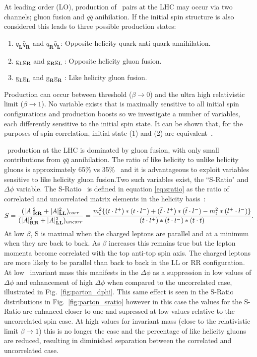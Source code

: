 At leading order (LO), production of \ttbar\ pairs at the LHC may occur via two channels; gluon fusion and $q\bar{q}$ anihilation. If the initial spin structure is also considered this leads to three possible production states:
\begin{enumerate}
\item $q_\mathbf{L}\bar{q}_\mathbf{R}$ and $q_\mathbf{R}\bar{q}_\mathbf{L}$: Opposite helicity quark anti-quark annihilation.
\item g$_\mathbf{L}$g$_\mathbf{R}$ and g$_\mathbf{R}$g$_\mathbf{L}$ : Opposite helicity gluon fusion.
\item g$_\mathbf{L}$g$_\mathbf{L}$ and g$_\mathbf{R}$g$_\mathbf{R}$ : Like helicity gluon fusion.
\end{enumerate}
Production can occur between threshold ($\beta \rightarrow 0$) and the ultra high relativistic limit ($\beta \rightarrow 1$). No variable exists that is maximally sensitive to all initial spin configurations and production boosts so we investigate a number of variables, each differently sensitive to the initial spin state. It can be shown that, for the purposes of spin correlation, initial state (1) and (2) are equivalent~\cite{mahlon:2010}. 

\ttbar\ production at the LHC is dominated by gluon fusion, with only small contributions from $q\bar{q}$ annihilation. The ratio of like helicity to unlike helicity gluons is approximately 65\% vs 35\%~\cite{mahlon:2010} and it is advantageous to exploit variables sensitive to like helicity gluon fusion.Two such variables exist, the ``S-Ratio" and $\Delta\phi$ variable. The S-Ratio~\cite{mahlon:2010} is defined in equation \ref{eq:sratio} as the ratio of correlated and uncorrelated matrix elements in the helicity basis~\cite{mahlon:2010}:
\begin{equation}
  S = \frac{(|A|_{\mathbf{RR}}^2 + |A|_{\mathbf{LL}}^2)_{corr}}{(|A|_{\mathbf{RR}}^2 + |A|_{\mathbf{LL}}^2)_{uncorr}}= \frac{m_t^2\{(t \cdot l^{+}) * (t \cdot l^{-}) + (\bar{t} \cdot l^{+}) * (\bar{t} \cdot l^{-}) - m_t^2 * (l^{+} \cdot l^{-})\}}
           {(t \cdot l^{+})*(\bar{t} \cdot l^{-})*(t \cdot \bar{t}) }.
\label{eq:sratio}
\end{equation}
At low $\beta$, S is maximal when the charged leptons are parallel and at a minimum when they are back to back. As $\beta$ increases this remains true but the lepton momenta become correlated with the top anti-top spin axis. The charged leptons are more likely to be parallel than back to back in the LL or RR configuration. At low \ttbar\ invariant mass this manifests in the $\Delta\phi$ as a suppression in low values of $\Delta\phi$ and enhancement of high $\Delta\phi$ when compared to the uncorrelated case, illustrated in Fig.~\ref{fig:parton_dphi}. This same effect is seen in the S-Ratio distributions in Fig.~\ref{fig:parton_sratio} however in this case the values for the S-Ratio are enhanced closer to one and supressed at low values relative to the uncorrelated spin case. At high values for invariant mass (close to the relativistic limit $\beta \rightarrow 1$) this is no longer the case and the percentage of like helicity gluons are reduced, resulting in diminished separation between the correlated and uncorrelated case.

